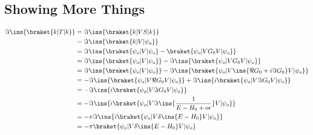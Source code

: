 \subsection{Showing More Things}
\begin{align}
	\Im\ins{\braket{k\vert T \vert k}} &= \Im\ins{\braket{k\vert VS \vert k}} \\
	&= \Im\ins{\braket{k\vert V \vert \psi_o}} \\
	&= \Im\ins{\braket{\psi_o\vert V \vert \psi_o} - \braket{\psi_o\vert VG_0 V \vert \psi_o}}\\
	&= \Im\ins{\braket{\psi_o\vert V \vert \psi_o}} - \Im\ins{\braket{\psi_o\vert VG_0 V \vert \psi_o}}\\
	&= \Im\ins{\braket{\psi_o\vert V \vert \psi_o}} - \Im\ins{\braket{\psi_o\vert V \ins{\Re G_0 + i\Im G_0} V \vert \psi_o}}\\
	&= - \Im\ins{\braket{\psi_o\vert V \Re G_0 V \vert \psi_o}} + \Im\ins{i\braket{\psi_o\vert V \Im G_0 V \vert \psi_o}}\\
	&= - \Im\ins{i\braket{\psi_o\vert V \Im G_0 V \vert \psi_o}}\\
	&= - \Im\ins{i\braket{\psi_o\vert V \Im\ins{\frac{1}{E-H_0+o\epsilon}} V \vert \psi_o}}\\
	&= - \pi\Im\ins{i\braket{\psi_o\vert V \delta\ins{E-H_0} V \vert \psi_o}}\\
	&= - \pi\braket{\psi_o\vert V \delta\ins{E-H_0} V \vert \psi_o}
\end{align}
